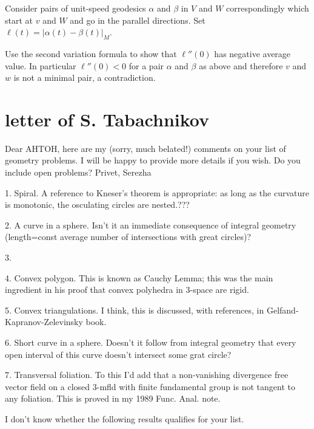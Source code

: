 Consider pairs of unit-speed geodesics $\alpha$ and $\beta$ 
in $V$ and $W$ correspondingly 
which start at $v$ and $W$ and go in the parallel directions. 
Set $\ell(t)=|\alpha(t)-\beta(t)|_M$.

Use the second variation formula to show that $\ell''(0)$ has negative average value. 
In particular $\ell''(0)<0$ for a pair $\alpha$ and $\beta$ as above
and therefore  $v$ and $w$ is not a minimal pair, a contradiction.



















\chapter{letter of S. Tabachnikov}

Dear AHTOH, here are my (sorry, much belated!) comments on your list
of geometry problems. I will be happy to provide more details if you
wish. Do you include open problems? Privet, Serezha

1. Spiral. A reference to Kneser's theorem is appropriate: as long as
the curvature is monotonic, the osculating circles are nested.???

2. A curve in a sphere. Isn't it an immediate consequence of integral
geometry (length=const \times average number of intersections with
great circles)?

3.

4. Convex polygon. This is known as Cauchy Lemma; this was the main
ingredient in his proof that convex polyhedra in 3-space are rigid.

5. Convex triangulations. I think, this is discussed, with
references, in Gelfand-Kapranov-Zelevinsky book.

6. Short curve in a sphere. Doesn't it follow from integral geometry
that every open interval of this curve doesn't intersect some grat
circle?

7. Transversal foliation. To this I'd add that a non-vanishing
divergence free vector field on a closed 3-mfld with finite
fundamental group is not tangent to any foliation. This is proved in
my 1989 Func. Anal. note.

I don't know whether the following results qualifies for your list.

